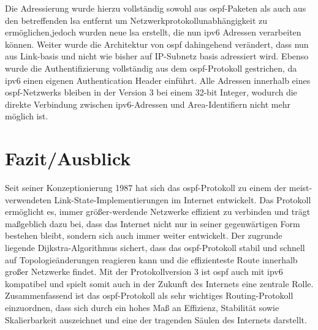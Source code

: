 \documentclass[11pt,a4paper,final]{article}
\begin{document}
Die Adressierung wurde hierzu vollständig sowohl aus \ac{ospf}-Paketen als auch aus den betreffenden \ac{lsa} entfernt um Netzwerkprotokollunabhängigkeit  zu ermöglichen,jedoch wurden neue \ac{lsa} erstellt, die nun \ac{ipv6} Adressen verarbeiten können. Weiter wurde die Architektur von \ac{ospf} dahingehend verändert, dass nun aus Link-basis und nicht wie bisher auf IP-Subnetz basis adressiert wird. Ebenso wurde die Authentifizierung vollständig aus dem \ac{ospf}-Protokoll gestrichen, da \ac{ipv6} einen eigenen Authentication Header einführt. Alle Adressen innerhalb eines \ac{ospf}-Netzwerks bleiben in der Version 3 bei einem 32-bit Integer, wodurch die direkte Verbindung zwischen \ac{ipv6}-Adressen und Area-Identifiern nicht mehr möglich ist. \citep{ospfv3}
\newpage
\section{Fazit/Ausblick}
Seit seiner Konzeptionierung 1987 hat sich das \ac{ospf}-Protokoll zu einem der meist-verwendeten Link-State-Implementierungen im Internet entwickelt. Das Protokoll ermöglicht es, immer größer-werdende Netzwerke effizient zu verbinden und trägt maßgeblich dazu bei, dass das Internet nicht nur in seiner gegenwärtigen Form bestehen bleibt, sondern sich auch immer weiter entwickelt. Der zugrunde liegende Dijkstra-Algorithmus sichert, dass das \ac{ospf}-Protokoll stabil und schnell auf Topologieänderungen reagieren kann und die effizienteste Route innerhalb großer Netzwerke findet. Mit der Protokollversion 3 ist \ac{ospf} auch mit \ac{ipv6} kompatibel und spielt somit auch in der Zukunft des Internets eine zentrale Rolle. \\
Zusammenfassend ist das \ac{ospf}-Protokoll als sehr wichtiges Routing-Protokoll einzuordnen, dass sich durch ein hohes Maß an Effizienz, Stabilität sowie Skalierbarkeit auszeichnet und eine der tragenden Säulen des Internets darstellt. 

\clearpage


\end{document}
